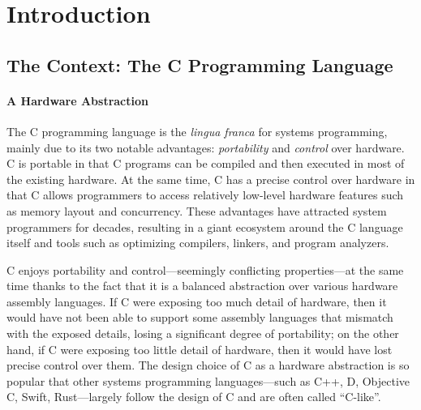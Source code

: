 \section{Introduction}
\label{sec:introduction}

\subsection{The Context: The C Programming Language}

\paragraph{A Hardware Abstraction}

The C programming language is the \emph{lingua franca} for systems programming, mainly due to its
two notable advantages: \emph{portability} and \emph{control} over hardware.  C is portable in that
C programs can be compiled and then executed in most of the existing hardware.  At the same time, C
has a precise control over hardware in that C allows programmers to access relatively low-level
hardware features such as memory layout and concurrency.  These advantages have attracted system
programmers for decades, resulting in a giant ecosystem around the C language itself and tools such
as optimizing compilers, linkers, and program analyzers.

C enjoys portability and control---seemingly conflicting properties---at the same time thanks to the
fact that it is a balanced abstraction over various hardware assembly languages.  If C were exposing
too much detail of hardware, then it would have not been able to support some assembly languages
that mismatch with the exposed details, losing a significant degree of portability; on the other
hand, if C were exposing too little detail of hardware, then it would have lost precise control over
them.  The design choice of C as a hardware abstraction is so popular that other systems programming
languages---such as C++, D, Objective C, Swift, Rust---largely follow the design of C and are often
called ``C-like''.




